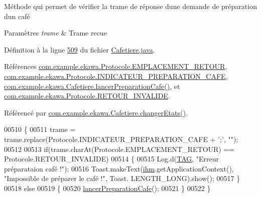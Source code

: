 Méthode qui permet de vérifier la trame de réponse d\textquotesingle{}une demande de préparation d\textquotesingle{}un café 


\begin{DoxyParams}{Paramètres}
{\em trame} & Trame recue \\
\hline
\end{DoxyParams}


Définition à la ligne \hyperlink{_cafetiere_8java_source_l00509}{509} du fichier \hyperlink{_cafetiere_8java_source}{Cafetiere.\+java}.



Références \hyperlink{_protocole_8java_source_l00071}{com.\+example.\+ekawa.\+Protocole.\+E\+M\+P\+L\+A\+C\+E\+M\+E\+N\+T\+\_\+\+R\+E\+T\+O\+UR}, \hyperlink{_protocole_8java_source_l00030}{com.\+example.\+ekawa.\+Protocole.\+I\+N\+D\+I\+C\+A\+T\+E\+U\+R\+\_\+\+P\+R\+E\+P\+A\+R\+A\+T\+I\+O\+N\+\_\+\+C\+A\+FE}, \hyperlink{_cafetiere_8java_source_l00527}{com.\+example.\+ekawa.\+Cafetiere.\+lancer\+Preparation\+Cafe()}, et \hyperlink{_protocole_8java_source_l00072}{com.\+example.\+ekawa.\+Protocole.\+R\+E\+T\+O\+U\+R\+\_\+\+I\+N\+V\+A\+L\+I\+DE}.



Référencé par \hyperlink{_cafetiere_8java_source_l00463}{com.\+example.\+ekawa.\+Cafetiere.\+changer\+Etats()}.


\begin{DoxyCode}
00510     \{
00511         trame = trame.replace(Protocole.INDICATEUR\_PREPARATION\_CAFE + \textcolor{charliteral}{';'}, \textcolor{stringliteral}{""});
00512 
00513         \textcolor{keywordflow}{if}(trame.charAt(Protocole.EMPLACEMENT\_RETOUR) == Protocole.RETOUR\_INVALIDE)
00514         \{
00515             Log.d(\hyperlink{classcom_1_1example_1_1ekawa_1_1_cafetiere_aa0c1fd99a2508b06c462aea17034aa91}{TAG}, \textcolor{stringliteral}{"Erreur préparataion café !"});
00516             Toast.makeText(\hyperlink{classcom_1_1example_1_1ekawa_1_1_cafetiere_a7db4a63088834eda5f6a3e951611bf82}{ihm}.getApplicationContext(), \textcolor{stringliteral}{"Impossible de préparer le café !"}, Toast.
      LENGTH\_LONG).show();
00517         \}
00518         \textcolor{keywordflow}{else}
00519         \{
00520             \hyperlink{classcom_1_1example_1_1ekawa_1_1_cafetiere_ac79907a8b3499bb9b2f50e31f8c904e8}{lancerPreparationCafe}();
00521         \}
00522     \}
\end{DoxyCode}
\mbox{\label{classcom_1_1example_1_1ekawa_1_1_cafetiere_ac3f2b337d1fd091faa312c2c6ec08bfc}} 
